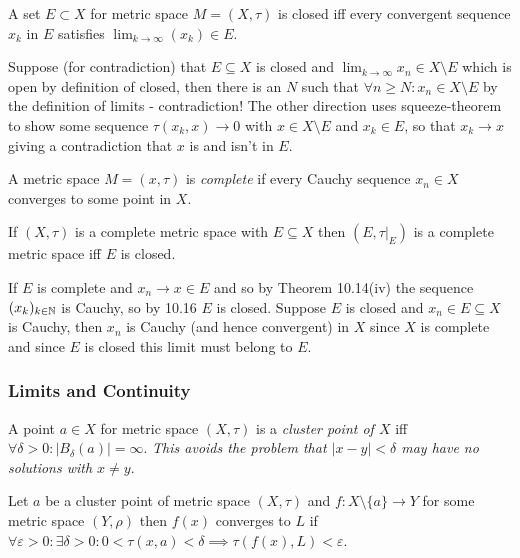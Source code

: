 \begin{multicols}{2}
\begin{theorem}[10.16]
A set $E\subset X$ for metric space $M=(X,\tau)$ is closed iff every convergent sequence $x_k$ in $E$ satisfies $\lim_{k\to\infty}(x_k)\in E$.
\end{theorem}
\begin{proof1}
Suppose (for contradiction) that $E\subseteq X$ is closed and $\lim_{k\to\infty}x_n \in X\setminus E$ which is open by definition of closed, then there is an $N$ such that $\forall n\geq N: x_n\in X\setminus E$ by the definition of limits - contradiction! The other direction uses squeeze-theorem to show some sequence $\tau(x_k,x)\to0$ with $x\in X\setminus E$ and $x_k\in E$, so that $x_k\to x$ giving a contradiction that $x$ is and isn't in $E$.
\end{proof1}

\begin{definition}[Complete]
A metric space $M=(x,\tau)$ is \textit{complete} if every Cauchy sequence $x_n\in X$ converges to some point in $X$.
\end{definition}

\begin{theorem}[10.21]
If $(X,\tau)$ is a complete metric space with $E\subseteq X$ then $(E,\tau|_{E})$ is a complete metric space iff $E$ is closed.
\end{theorem}
\begin{proof1}
If $E$ is complete and $x_n\to x\in E$ and so by Theorem 10.14(iv) the sequence $(x_k)_{k\in\mathbb{N}}$ is Cauchy, so by 10.16 $E$ is closed. Suppose $E$ is closed and $x_n\in E\subseteq X$ is Cauchy, then $x_n$ is Cauchy (and hence convergent) in $X$ since $X$ is complete and since $E$ is closed this limit must belong to $E$.
\end{proof1}

\subsubsection*{Limits and Continuity}
\begin{definition}
A point $a\in X$ for metric space $(X,\tau)$ is a \textit{cluster point of $X$} iff $\forall\delta>0: |B_\delta(a)|=\infty$. \textit{This avoids the problem that $|x-y|<\delta$ may have no solutions with $x\neq y$}.
\end{definition}

\begin{definition}[Convergence]
Let $a$ be a cluster point of metric space $(X,\tau)$ and $f:X\setminus\{a\}\to Y$ for some metric space $(Y,\rho)$ then $f(x)$ converges to $L$ if $\forall\varepsilon>0:\exists\delta>0: 0<\tau(x,a)<\delta\implies\tau(f(x),L)<\varepsilon$.
\end{definition}


\end{multicols}
